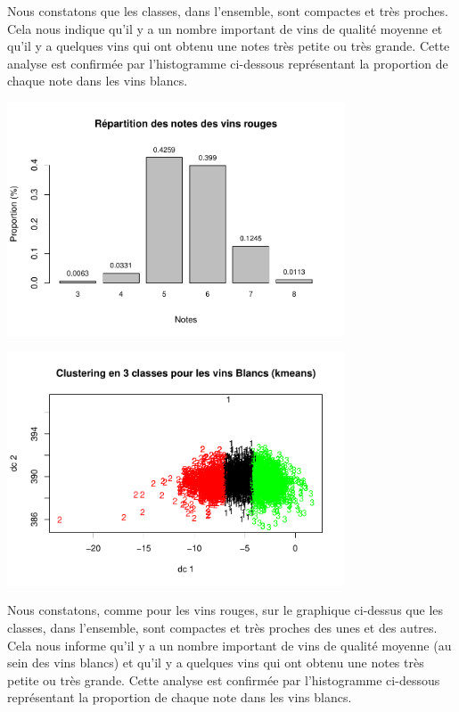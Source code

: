 \documentclass[
]{article}
\begin{document}
Nous constatons que les classes, dans l'ensemble, sont compactes et très
proches. Cela nous indique qu'il y a un nombre important de vins de
qualité moyenne et qu'il y a quelques vins qui ont obtenu une notes très
petite ou très grande. Cette analyse est confirmée par l'histogramme
ci-dessous représentant la proportion de chaque note dans les vins
blancs.

\begin{center}
	\includegraphics[width=10cm]{repport_files/figure-latex/unnamed-chunk-9-1.pdf}

\includegraphics[width=10cm]{repport_files/figure-latex/unnamed-chunk-10-1.pdf}
\end{center} Nous
constatons, comme pour les vins rouges, sur le graphique ci-dessus que
les classes, dans l'ensemble, sont compactes et très proches des unes et
des autres. Cela nous informe qu'il y a un nombre important de vins de
qualité moyenne (au sein des vins blancs) et qu'il y a quelques vins qui
ont obtenu une notes très petite ou très grande. Cette analyse est
confirmée par l'histogramme ci-dessous représentant la proportion de
chaque note dans les vins blancs.
\end{document}
